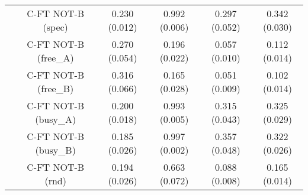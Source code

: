 \begin{table}[h]
{\begin{tabular}{cccccc}
 & C-FT NOT-B (spec)         & 0.230 (0.012) & 0.992 (0.006) & 0.297 (0.052) & 0.342 (0.030) \\ 
 & C-FT NOT-B (free_A)       & 0.270 (0.054) & 0.196 (0.022) & 0.057 (0.010) & 0.112 (0.014) \\ 
 & C-FT NOT-B (free_B)       & 0.316 (0.066) & 0.165 (0.028) & 0.051 (0.009) & 0.102 (0.014) \\ 
 & C-FT NOT-B (busy_A)       & 0.200 (0.018) & 0.993 (0.005) & 0.315 (0.043) & 0.325 (0.029) \\ 
 & C-FT NOT-B (busy_B)       & 0.185 (0.026) & 0.997 (0.002) & 0.357 (0.048) & 0.322 (0.026) \\ 
 & C-FT NOT-B (rnd)          & 0.194 (0.026) & 0.663 (0.072) & 0.088 (0.008) & 0.165 (0.014) \\ \bottomrule
\end{tabular}
}
\end{table}
